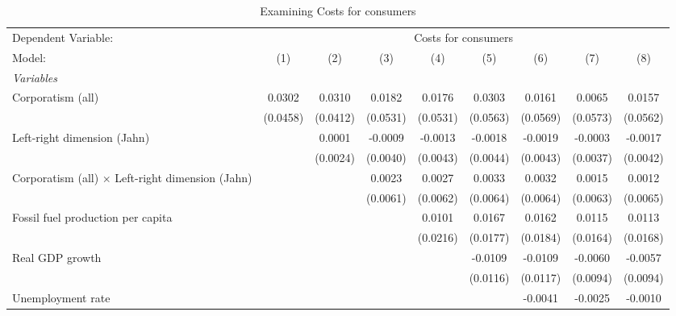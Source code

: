 
\begin{table}[htbp]
   \caption{Examining Costs for consumers}
   \centering
   \begin{tabular}{lcccccccc}
      \tabularnewline \midrule \midrule
      Dependent Variable: & \multicolumn{8}{c}{Costs for consumers}\\
      Model:                                                  & (1)      & (2)      & (3)      & (4)      & (5)      & (6)      & (7)      & (8)\\  
      \midrule
      \emph{Variables}\\
      Corporatism (all)                                       & 0.0302   & 0.0310   & 0.0182   & 0.0176   & 0.0303   & 0.0161   & 0.0065   & 0.0157\\   
                                                              & (0.0458) & (0.0412) & (0.0531) & (0.0531) & (0.0563) & (0.0569) & (0.0573) & (0.0562)\\   
      Left-right dimension (Jahn)                             &          & 0.0001   & -0.0009  & -0.0013  & -0.0018  & -0.0019  & -0.0003  & -0.0017\\   
                                                              &          & (0.0024) & (0.0040) & (0.0043) & (0.0044) & (0.0043) & (0.0037) & (0.0042)\\   
      Corporatism (all) $\times$ Left-right dimension (Jahn)  &          &          & 0.0023   & 0.0027   & 0.0033   & 0.0032   & 0.0015   & 0.0012\\   
                                                              &          &          & (0.0061) & (0.0062) & (0.0064) & (0.0064) & (0.0063) & (0.0065)\\   
      Fossil fuel production per capita                       &          &          &          & 0.0101   & 0.0167   & 0.0162   & 0.0115   & 0.0113\\   
                                                              &          &          &          & (0.0216) & (0.0177) & (0.0184) & (0.0164) & (0.0168)\\   
      Real GDP growth                                         &          &          &          &          & -0.0109  & -0.0109  & -0.0060  & -0.0057\\   
                                                              &          &          &          &          & (0.0116) & (0.0117) & (0.0094) & (0.0094)\\   
      Unemployment rate                                       &          &          &          &          &          & -0.0041  & -0.0025  & -0.0010\\   

\end{tabular}
\end{table}
